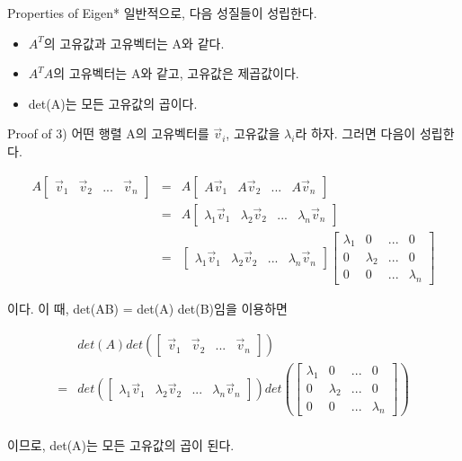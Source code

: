 \documentclass{beamer}
\begin{document}
\begin{frame}{Properties of Eigen*}
일반적으로, 다음 성질들이 성립한다. 

\begin{itemize} 
\item $A^T$의 고유값과 고유벡터는 A와 같다. 
\item $A^TA$의 고유벡터는 A와 같고, 고유값은 제곱값이다. 
\item det(A)는 모든 고유값의 곱이다. 
\end{itemize}

\end{frame}

\begin{frame}[allowframebreaks]{Proof of 3)} 
어떤 행렬 A의 고유벡터를 $\vec{v}_i$, 고유값을 $\lambda_i$라 하자. 그러면 다음이 성립한다. 

\begin{eqnarray}
A \left[ \begin{matrix} 
\vec{v}_1 & \vec{v}_2 & ... & \vec{v}_n
\end{matrix} \right] 
 &=& A \left[ \begin{matrix} 
A\vec{v}_1 & A\vec{v}_2 & ... & A\vec{v}_n
\end{matrix} \right]  \\
&=& A \left[ \begin{matrix} 
\lambda_1 \vec{v}_1 & \lambda_2 \vec{v}_2 & ... & \lambda_n \vec{v}_n
\end{matrix} \right] \\
&=& \left[ \begin{matrix} 
\lambda_1 \vec{v}_1 & \lambda_2 \vec{v}_2 & ... & \lambda_n \vec{v}_n
\end{matrix} \right] 
\left[ \begin{matrix} 
\lambda_1 & 0 & ... & 0 \\
0 & \lambda_2 & ... & 0 \\
0 & 0 & ... & \lambda_n 
\end{matrix} \right] 
\end{eqnarray}

이다. 이 때, det(AB) = det(A) det(B)임을 이용하면 

\begin{eqnarray} 
& det(A) det \left( \left[ \begin{matrix} 
\vec{v}_1 & \vec{v}_2 & ... & \vec{v}_n
\end{matrix} \right]  \right) \\
= & det\left(\left[ \begin{matrix} 
\lambda_1 \vec{v}_1 & \lambda_2 \vec{v}_2 & ... & \lambda_n \vec{v}_n
\end{matrix} \right] \right)
det \left(\left[ \begin{matrix} 
\lambda_1 & 0 & ... & 0 \\
0 & \lambda_2 & ... & 0 \\
0 & 0 & ... & \lambda_n 
\end{matrix} \right] \right)\\
\end{eqnarray}

이므로, det(A)는 모든 고유값의 곱이 된다. 
\end{frame}
\end{document}

